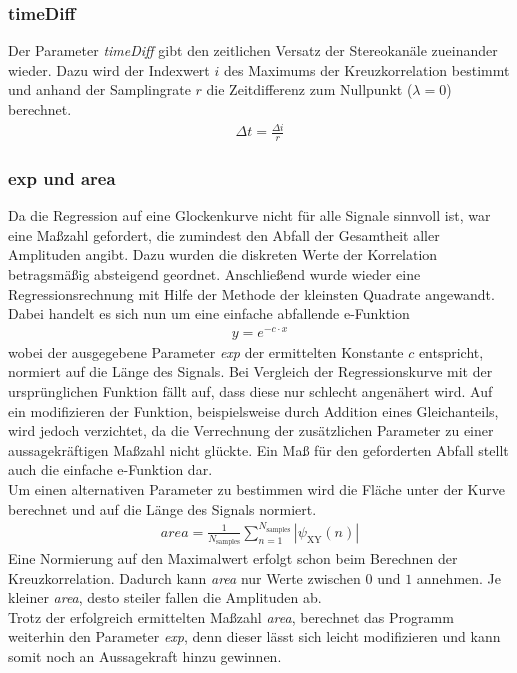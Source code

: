 \subsubsection{timeDiff}
Der Parameter \textit{timeDiff} gibt den zeitlichen Versatz der Stereokanäle zueinander wieder. Dazu wird der Indexwert $i$ des Maximums der Kreuzkorrelation bestimmt und anhand der Samplingrate $r$ die Zeitdifferenz zum Nullpunkt ($\lambda = 0$) berechnet.
\begin{align*}
\Delta t = \frac{\Delta i}{r}
\end{align*}
\subsubsection{exp und area}
Da die Regression auf eine Glockenkurve nicht für alle Signale sinnvoll ist, war eine Maßzahl gefordert, die zumindest den Abfall der Gesamtheit aller Amplituden angibt. Dazu wurden die diskreten Werte der Korrelation betragsmäßig absteigend geordnet. Anschließend wurde wieder eine Regressionsrechnung mit Hilfe der Methode der kleinsten Quadrate angewandt. Dabei handelt es sich nun um eine einfache abfallende e-Funktion
\begin{align*}
y = e^{-c \cdot x}
\end{align*}
wobei der ausgegebene Parameter \textit{exp} der ermittelten Konstante $c$ entspricht, normiert auf die Länge des Signals. Bei Vergleich der Regressionskurve mit der ursprünglichen Funktion fällt auf, dass diese nur schlecht angenähert wird. Auf ein modifizieren der Funktion, beispielsweise durch Addition eines Gleichanteils, wird jedoch verzichtet, da die Verrechnung der zusätzlichen Parameter zu einer aussagekräftigen Maßzahl nicht glückte. Ein Maß für den geforderten Abfall stellt auch die einfache e-Funktion dar. 
\\Um einen alternativen Parameter zu bestimmen wird die Fläche unter der Kurve berechnet und auf die Länge des Signals normiert. 
\begin{align*}
area = \frac{1}{N_{\text{samples}}} \sum_{n=1}^{N_{\text{samples}}} |\psi_{\text{XY}}(n)|
\end{align*}
Eine Normierung auf den Maximalwert erfolgt schon beim Berechnen der Kreuzkorrelation. Dadurch kann \textit{area} nur Werte zwischen $0$ und $1$ annehmen. Je kleiner \textit{area}, desto steiler fallen die Amplituden ab. 
\\Trotz der erfolgreich ermittelten Maßzahl \textit{area}, berechnet das Programm weiterhin den Parameter \textit{exp}, denn dieser lässt sich leicht modifizieren und kann somit noch an Aussagekraft hinzu gewinnen. 
